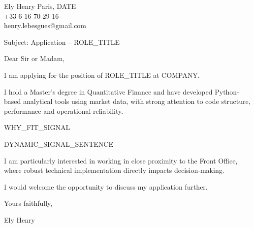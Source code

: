 \documentclass[10pt,a4paper]{article}
\begin{document}
\noindent Ely Henry \hfill Paris, {{DATE}} \\
+33 6 16 70 29 16 \\
henry.lebesgues@gmail.com \\

\vspace{1cm}

\noindent Subject: Application – {{ROLE_TITLE}}

\vspace{0.5cm}

Dear Sir or Madam,

\vspace{0.5cm}

I am applying for the position of {{ROLE_TITLE}} at {{COMPANY}}.

I hold a Master’s degree in Quantitative Finance and have developed Python-based analytical tools using market data, with strong attention to code structure, performance and operational reliability.

{{WHY_FIT_SIGNAL}}

{{DYNAMIC_SIGNAL_SENTENCE}}

I am particularly interested in working in close proximity to the Front Office, where robust technical implementation directly impacts decision-making.

I would welcome the opportunity to discuss my application further.

Yours faithfully,

\vspace{1cm}

\noindent Ely Henry
\end{document}
